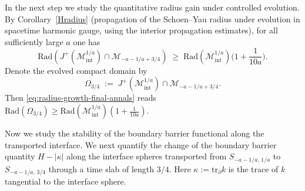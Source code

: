 \documentclass{amsart}
\newcommand{\tr}{\mbox{tr}}
\begin{document}
{\medskip

\noindent In the next step we study the quantitative radius gain under controlled evolution.
By Corollary~\ref{Hradius} (propagation of the Schoen--Yau radius under evolution in spacetime harmonic gauge, using the interior propagation estimates), for all sufficiently large $a$ one has
\begin{equation}\label{eq:radius-growth-final-annals}
\text{Rad}\!\left(
J^+(\mathcal M^{1/a}_{\mathrm{int}})
\cap
\mathcal M_{-a-1/a+3/4}
\right)
\;\ge\;
\text{Rad}(\mathcal M^{1/a}_{\mathrm{int}})
\Big(1+\frac{1}{10a}\Big).
\end{equation}
Denote the evolved compact domain by
\[
\Omega_{3/4}
\;:=\;
J^+(\mathcal M^{1/a}_{\mathrm{int}})\cap \mathcal M_{-a-1/a+3/4}.
\]
Then \eqref{eq:radius-growth-final-annals} reads $\text{Rad}(\Omega_{3/4})\ge \text{Rad}(\mathcal M^{1/a}_{\mathrm{int}})(1+\frac{1}{10a})$.

\medskip

\noindent
Now we study the stability of the boundary barrier functional along the transported interface.
We next quantify the change of the boundary barrier quantity $H-|\kappa|$ along the interface spheres transported from $S_{-a-1/a,\,1/a}$ to $S_{-a-1/a,\,3/4}$ through a time slab of length $3/4$. Here $\kappa:=\tr_{\partial}k$ is the trace of $k$ tangential to the interface sphere.

}
\end{document}
